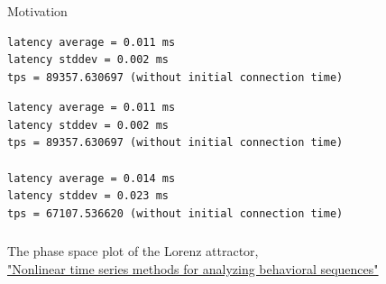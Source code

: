 \documentclass[usenames,dvipsnames, 18pt, compress, aspectratio=169]{beamer}
\begin{document}
\begin{frame}[fragile]{}
    \frametitle{}
    \begin{center}
        Motivation

		\begin{overprint}[14.5cm]
        \begin{verbatim}
latency average = 0.011 ms
latency stddev = 0.002 ms
tps = 89357.630697 (without initial connection time)
        \end{verbatim}

        \begin{verbatim}
latency average = 0.011 ms
latency stddev = 0.002 ms
tps = 89357.630697 (without initial connection time)

latency average = 0.014 ms
latency stddev = 0.023 ms
tps = 67107.536620 (without initial connection time)
        \end{verbatim}
		\end{overprint}

    \end{center}
\end{frame}

\begin{frame}
    \frametitle{}
    \begin{center}
            {
                The phase space plot of the Lorenz attractor,
                \\ {\scriptsize
                    \href{https://www.researchgate.net/publication/339796576_Nonlinear_time_series_methods_for_analyzing_behavioral_sequences}
                         {{\color{gray!60} "Nonlinear time series methods for analyzing behavioral sequences"}}}
            }

    \end{center}
\end{frame}
\end{document}
